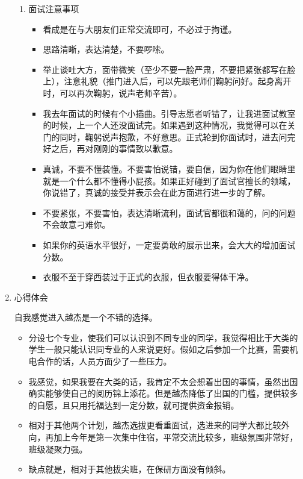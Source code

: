 \documentclass[zihao=-4,fontset=none]{Beautybook-CN}
\begin{document}
\begin{enumerate}
\begin{enumerate}
	      	\item 面试注意事项
	      	      \begin{itemize}
	      	      	\item 看成是在与大朋友们正常交流即可，不必过于拘谨。
	      	      	\item 思路清晰，表达清楚，不要啰嗦。
	      	      	\item 举止谈吐大方，面带微笑（至少不要一脸严肃，不要把紧张都写在脸上），注意礼貌（推门进入后，可以先跟老师们鞠躬问好。起身离开时，可以再次鞠躬，说声老师辛苦）。
	      	      	\item 我去年面试的时候有个小插曲。引导志愿者听错了，让我进面试教室的时候，上一个人还没面试完。如果遇到这种情况，我觉得可以在关门的同时，鞠躬说声抱歉，不好意思。正式轮到你面试时，进去问完好之后，再对刚刚的事情致以歉意。
	      	      	\item 真诚，不要不懂装懂。不要害怕说错，要自信，因为你在他们眼睛里就是一个什么都不懂得小屁孩。如果正好碰到了面试官擅长的领域，你说错了，真诚的接受并表示会在此方面进行进一步的了解。
	      	      	\item 不要紧张，不要害怕，表达清晰流利，面试官都很和蔼的，问的问题不会故意刁难你。
	      	      	\item 如果你的英语水平很好，一定要勇敢的展示出来，会大大的增加面试分数。
	      	      	\item 衣服不至于穿西装过于正式的衣服，但衣服要得体干净。
	      	      \end{itemize}
	      \end{enumerate}    
	      	      	      
	\item 心得体会 
	      
	      自我感觉进入越杰是一个不错的选择。
	      \begin{itemize}
	      	\item 分设七个专业，使我们可以认识到不同专业的同学，我觉得相比于大类的学生一般只能认识同专业的人来说更好。假如之后参加一个比赛，需要机电合作的话，人员方面少了一些压力。
	      	\item 我感觉，如果我要在大类的话，我肯定不太会想着出国的事情，虽然出国确实能够使自己的阅历锦上添花。但是越杰降低了出国的门槛，提供较多的自愿，且只用托福达到一定分数，就可提供资金报销。
	      	\item 相对于其他两个计划，越杰选拔更看重面试，选进来的同学大都比较外向，再加上今年是第一次集中住宿，平常交流比较多，班级氛围非常好，班级凝聚力强。
	      	\item 缺点就是，相对于其他拔尖班，在保研方面没有倾斜。
	      \end{itemize}
\end{enumerate}
\end{document}
